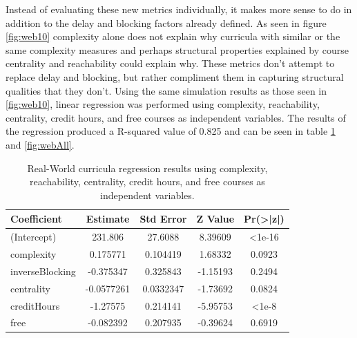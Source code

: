 \documentclass[botnum, fleqn]{unmeethesis}
\begin{document}
      Instead of evaluating these new metrics individually, it makes more sense to do in addition to the delay and blocking factors already defined.  As seen in figure \ref{fig:web10} complexity alone does not explain why curricula with similar or the same complexity measures and perhaps structural properties explained by course centrality and reachability could explain why. These metrics don't attempt to replace delay and blocking, but rather compliment them in capturing structural qualities that they don't. Using the same simulation results as those seen in \ref{fig:web10}, linear regression was performed using complexity, reachability, centrality, credit hours, and free courses as independent variables. The results of the regression produced a R-squared value of 0.825 and can be seen in table \ref{tab:webAll} and \ref{fig:webAll}.

      \begin{table}[!h]
        \centering
        \caption{Real-World curricula regression results using complexity, reachability, centrality, credit hours, and free courses as independent variables.}
        \label{tab:webAll}
        \begin{tabular}{l*{4}{c}}
          Coefficient       & Estimate      & Std Error   & Z Value     & Pr(>|z|)  \\
          \hline
          (Intercept)       &     231.806   &   27.6088   &  8.39609    &   <1e-16  \\
          complexity        &    0.175771   &  0.104419   &  1.68332    &   0.0923  \\
          inverseBlocking   &   -0.375347   &  0.325843   & -1.15193    &   0.2494  \\
          centrality        &  -0.0577261   & 0.0332347   & -1.73692    &   0.0824  \\
          creditHours       &    -1.27575   &  0.214141   & -5.95753    &    <1e-8  \\
          free              &   -0.082392   &  0.207935   & -0.39624    &   0.6919  \\
        \end{tabular}
      \end{table}
\end{document}
